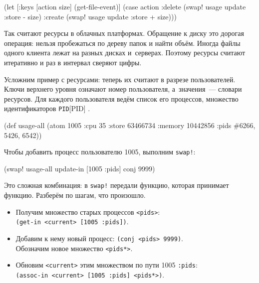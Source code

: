 \begin{english}
  \begin{clojure}
(let [{:keys [action size]} (get-file-event)]
  (case action
    :delete
    (swap! usage update :store - size)
    :create
    (swap! usage update :store + size)))
  \end{clojure}
\end{english}


Так считают ресурсы в облачных платформах. Обращение к диску это дорогая
операция: нельзя пробежаться по дереву папок и найти объём. Иногда файлы
одного клиента лежат на разных дисках и~серверах. Поэтому ресурсы считают
итеративно и раз в интервал сверяют цифры.


Усложним пример с ресурсами: теперь их считают в разрезе пользователей. Ключи
верхнего уровня означают номер пользователя, а~значения~--- словари
ресурсов. Для каждого пользователя ведём список его процессов, множество
идентификаторов \verb|PID|[PID]
.

\begin{english}
  \begin{clojure/lines}
(def usage-all
  (atom {1005 {:cpu 35
               :store 63466734
               :memory 10442856
               :pids #{6266, 5426, 6542}}}))
  \end{clojure/lines}
\end{english}

\noindent
Чтобы добавить процесс пользователю 1005, выполним \verb|swap!|:

\begin{english}
  \begin{clojure}
(swap! usage-all update-in [1005 :pids] conj 9999)
  \end{clojure}
\end{english}

Это сложная комбинация: в \verb|swap!| передали функцию, которая принимает
функцию. Разберём по шагам, что произошло.

\begin{itemize}

\item
  Получим множество старых процессов \verb|<pids>|:\\
  \verb|(get-in <current> [1005 :pids])|.

\item
  Добавим к нему новый процесс: \verb|(conj <pids> 9999)|.\\
  Обозначим новое множество \verb|<pids*>|.

\item
  Обновим \verb|<current>| этим множеством по пути 1005 \arr{} \verb|:pids|:\\
  \verb|(assoc-in <current> [1005 :pids] <pids*>)|.

\end{itemize}


